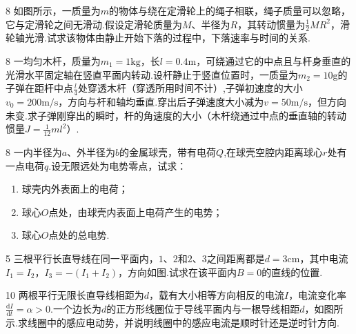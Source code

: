 \hspace{-2.16em}
\begin{minipage}{0.67\textwidth}
    \begin{exercise}{8}{}
        如图所示，一质量为$m$的物体与绕在定滑轮上的绳子相联，绳子质量可以忽略，它与定滑轮之间无滑动.假设定滑轮质量为$M$、半径为$R$，其转动惯量为$\frac{1}{2}MR^2$，滑轮轴光滑.试求该物体由静止开始下落的过程中，下落速率与时间的关系.
        \end{exercise}
\end{minipage}
\hfill
\begin{minipage}[c]{0.33\textwidth}
\begin{center}
    \begin{tikzpicture}
    
    \end{tikzpicture}
\end{center}
\end{minipage}

\begin{exercise}{8}{}
一均匀木杆，质量为$m_1=1\mathrm{kg}$，长$l=0.4\mathrm{m}$，可绕通过它的中点且与杆身垂直的光滑水平固定轴在竖直平面内转动.设杆静止于竖直位置时，一质量为$m_2=10\mathrm{g}$的子弹在距杆中点$\frac{l}{4}$处穿透木杆（穿透所用时间不计）,子弹初速度的大小$v_0=200\mathrm{m/s}$，方向与杆和轴均垂直.穿出后子弹速度大小减为$v=50\mathrm{m/s}$，但方向未变.求子弹刚穿出的瞬时，杆的角速度的大小（木杆绕通过中点的垂直轴的转动惯量$J=\frac{1}{12}ml^2$）.
\end{exercise}
\begin{exercise}{8}{}
一内半径为$a$、外半径为$b$的金属球壳，带有电荷$Q$,在球壳空腔内距离球心$r$处有一点电荷$q$.设无限远处为电势零点，试求：
\begin{enumerate}[(1)]
    \item 球壳内外表面上的电荷；
    \item 球心$O$点处，由球壳内表面上电荷产生的电势；
    \item 球心$O$点处的总电势.
\end{enumerate}
\end{exercise}

\hspace{-2.16em}
\begin{minipage}{0.67\textwidth}
    \begin{exercise}{5}{}
        三根平行长直导线在同一平面内，$1$、$2$和$2$、$3$之间距离都是$d=3\mathrm{cm}$，其中电流$I_1=I_2$，$I_3=-\left(I_1+I_2\right)$，方向如图.试求在该平面内$B=0$的直线的位置.
        \end{exercise}
\end{minipage}
\hfill
\begin{minipage}[c]{0.33\textwidth}
\begin{center}
    \begin{tikzpicture}
    
    \end{tikzpicture}
\end{center}
\end{minipage}

\begin{exercise}{10}{}
两根平行无限长直导线相距为$d$，载有大小相等方向相反的电流$I$，电流变化率$\frac{\mathrm{d}I}{\mathrm{d}t}=\alpha>0$.一个边长为$d$的正方形线圈位于导线平面内与一根导线相距$d$，如图所示.求线圈中的感应电动势，并说明线圈中的感应电流是顺时针还是逆时针方向.
\end{exercise}
